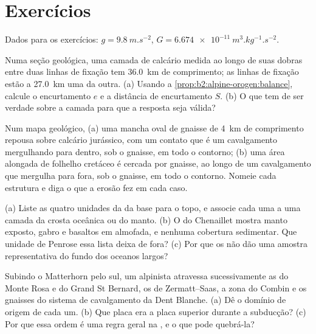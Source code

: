 \section*{Exercícios}\label{sec:b2:alpine-orogen:exercises}

Dados para os exercícios: $g = \qty{9.8}{m.s^{-2}}$,
$G = \qty{6.674e-11}{m^3.kg^{-1}.s^{-2}}$.

\begin{exercise}[$\star$]\label{exo:b2:alpine-orogen:1}
Numa seção geológica, uma camada de calcário medida ao longo de suas dobras entre duas linhas de fixação tem
\qty{36.0}{km} de comprimento; as linhas de fixação estão a \qty{27.0}{km} uma da outra. (a) Usando a
\cref{prop:b2:alpine-orogen:balance}, calcule o encurtamento $e$ e a distância de encurtamento
$S$. (b) O que tem de ser verdade sobre a camada para que a resposta seja válida?
\end{exercise}

\begin{exercise}[$\star$]\label{exo:b2:alpine-orogen:2}
Num mapa geológico, (a) uma mancha oval de gnaisse de \qty{4}{km} de comprimento repousa sobre calcário
jurássico, com um contato que é um cavalgamento mergulhando para dentro, sob o gnaisse, em todo o contorno; (b) uma
área alongada de folhelho cretáceo é cercada por gnaisse, ao longo de um cavalgamento que mergulha
para fora, sob o gnaisse, em todo o contorno. Nomeie cada estrutura e diga o que a erosão fez
em cada caso.
\end{exercise}

\begin{exercise}[$\star$]\label{exo:b2:alpine-orogen:3}
(a) Liste as quatro unidades da  da base para o topo, e associe cada uma
a uma camada da crosta oceânica ou do manto. (b) O  do Chenaillet mostra manto
exposto, gabro e basaltos em almofada, e nenhuma cobertura sedimentar. Que unidade de Penrose essa
lista deixa de fora? (c) Por que os  não dão uma amostra representativa do fundo dos
oceanos largos?
\end{exercise}

\begin{exercise}[$\star$]\label{exo:b2:alpine-orogen:4}
Subindo o Matterhorn pelo sul, um alpinista atravessa sucessivamente as  do Monte Rosa e do
Grand St Bernard, os  de Zermatt--Saas, a zona do Combin e os gnaisses do sistema de
cavalgamento da Dent Blanche. (a) Dê o domínio de origem de cada um. (b) Que placa era
a placa superior durante a subducção? (c) Por que essa ordem é uma regra geral na ,
e o que pode quebrá-la?
\end{exercise}

